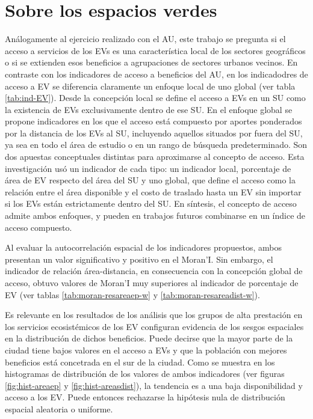 \documentclass[12pt,a4paper,oneside, openany]{book}
\theoremstyle{definition}
\theoremstyle{definition}
\theoremstyle{definition}
\theoremstyle{remark}
\begin{document}
\section{Sobre los espacios verdes}\label{sobre-los-espacios-verdes}

Análogamente al ejercicio realizado con el AU, este trabajo se pregunta
si el acceso a servicios de los EVs es una característica local de los
sectores geográficos o si se extienden esos beneficios a agrupaciones de
sectores urbanos vecinos. En contraste con los indicadores de acceso a
beneficios del AU, en los indicadodres de acceso a EV se diferencia
claramente un enfoque local de uno global (ver tabla \ref{tab:ind-EV}).
Desde la concepción local se define el acceso a EVs en un SU como la
existencia de EVs exclusivamente dentro de ese SU. En el enfoque global
se propone indicadores en los que el acceso está compuesto por aportes
ponderados por la distancia de los EVs al SU, incluyendo aquellos
situados por fuera del SU, ya sea en todo el área de estudio o en un
rango de búsqueda predeterminado. Son dos apuestas conceptuales
distintas para aproximarse al concepto de acceso. Esta investigación usó
un indicador de cada tipo: un indicador local, porcentaje de área de EV
respecto del área del SU y uno global, que define el acceso como la
relación entre el área disponible y el costo de traslado hasta un EV sin
importar si los EVs están estrictamente dentro del SU. En síntesis, el
concepto de acceso admite ambos enfoques, y pueden en trabajos futuros
combinarse en un índice de acceso compuesto.

Al evaluar la autocorrelación espacial de los indicadores propuestos,
ambos presentan un valor significativo y positivo en el Moran'I. Sin
embargo, el indicador de relación área-distancia, en consecuencia con la
concepción global de acceso, obtuvo valores de Moran'I muy superiores al
indicador de porcentaje de EV (ver tablas \ref{tab:moran-resareaep-w} y
\ref{tab:moran-resareadist-w}).

Es relevante en los resultados de los análisis que los grupos de alta
prestación en los servicios ecosistémicos de los EV configuran evidencia
de los sesgos espaciales en la distribución de dichos beneficios. Puede
decirse que la mayor parte de la ciudad tiene bajos valores en el acceso
a EVs y que la población con mejores beneficios está concetrada en el
sur de la ciudad. Como se muestra en los histogramas de distribución de
los valores de ambos indicadores (ver figuras \ref{fig:hist-areaep} y
\ref{fig:hist-areasdist}), la tendencia es a una baja disponibilidad y
acceso a los EV. Puede entonces rechazarse la hipótesis nula de
distribución espacial aleatoria o uniforme.
\end{document}
